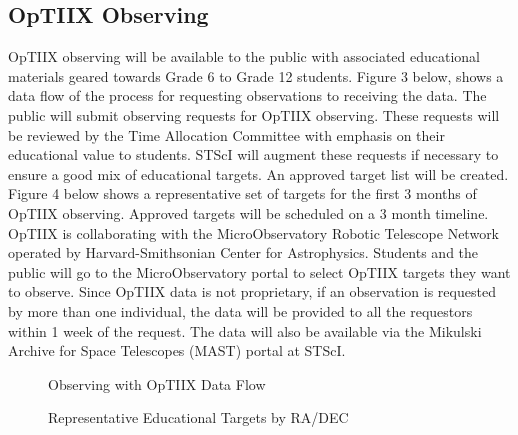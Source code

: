 \subsection {OpTIIX Observing}
OpTIIX observing will be available to the public with associated educational materials geared towards Grade 6 to Grade 12 students. Figure 3 below, shows a data flow of the process for requesting observations to receiving the data.  The public will submit observing requests for OpTIIX observing.   These requests will be reviewed by the Time Allocation Committee with emphasis on their educational value to students. STScI will augment these requests if necessary to ensure a good mix of educational targets.  An approved target list will be created.  Figure 4 below shows a representative set of targets for the first 3 months of OpTIIX observing.  Approved targets will be scheduled on a 3 month timeline.  OpTIIX is collaborating with the MicroObservatory Robotic Telescope Network operated by Harvard-Smithsonian Center for Astrophysics.  Students and the public will go to the MicroObservatory portal to select OpTIIX targets they want to observe.  Since OpTIIX data is not proprietary, if an observation is requested by more than one individual, the data will be provided to all the requestors within 1 week of the request.  The data will also be available via the Mikulski Archive for Space Telescopes (MAST) portal at STScI.

\begin{figure}[ht!]
\caption{Observing with OpTIIX Data Flow}
\end{figure}

\begin{figure}[ht!]
\caption{Representative Educational Targets by RA/DEC}
\end{figure}


